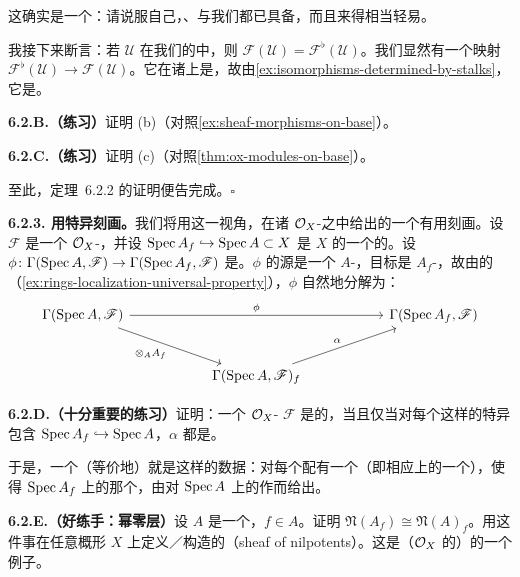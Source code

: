 这确实是一个\trSheaf{}：请说服自己，\trRestrictionMap、\trIdentityAxiom{}与\trGluability{}我们都已具备，而且来得相当轻易。

我接下来断言：若 $\mathscr{U}$ 在我们的\trBase{}中，则 $\mathscr{F}(\mathscr{U})=\mathscr{F}^{\flat}(\mathscr{U})$。我们显然有一个映射 $\mathscr{F}^{\flat}(\mathscr{U})\to\mathscr{F}(\mathscr{U})$。它在诸\trStalk{}上是\trIsomorphism，故由\cref{ex:isomorphisms-determined-by-stalks}，它是\trIsomorphism。

\textbf{6.2.B.（练习）}\quad 证明 (b)（对照\cref{ex:sheaf-morphisms-on-base}）。

\textbf{6.2.C.（练习）}\quad 证明 (c)（对照\cref{thm:ox-modules-on-base}）。

至此，定理~6.2.2 的证明便告完成。\hfill$\square$

\textbf{6.2.3. 用特异\trInclusionMap{}刻画\trQCSheaf。}\quad 我们将用这一视角，在诸 $\mathcal{O}_X$-\trModule{}之中给出\trQCSheaf{}的一个有用刻画。设 $\mathscr{F}$ 是一个 $\mathcal{O}_X$-\trModule，并设 $\operatorname{Spec} A_f\hookrightarrow\operatorname{Spec} A\subset X$ 是 $X$ 的一个\trAffine\trOpenSubscheme{}的\trDistinguishedOpen\trSubscheme。设 $\phi\colon\Gamma(\operatorname{Spec} A,\mathscr{F})\to\Gamma(\operatorname{Spec} A_f,\mathscr{F})$ 是\trRestrictionMap。$\phi$ 的源是一个 $A$-\trModule，目标是 $A_f$-\trModule，故由\trLocalization{}的\trUniversalProperty{}（\cref{ex:rings-localization-universal-property}），$\phi$ 自然地分解为：
\[
\begin{tikzcd}[row sep=2.6em, column sep=5.5em]
\Gamma(\Spec A,\mathscr{F}) \ar[rr,"\phi"] \ar[dr,"\otimes_A A_f"'] && \Gamma(\Spec A_f,\mathscr{F}) \\
& \Gamma(\Spec A,\mathscr{F})_f \ar[ur,"\alpha"] &
\end{tikzcd}
\]

\textbf{6.2.D.（十分重要的练习）}\quad 证明：一个 $\mathcal{O}_X$-\trModule{} $\mathscr{F}$ 是\trQC{}的，当且仅当对每个这样的特异包含 $\operatorname{Spec} A_f\hookrightarrow\operatorname{Spec} A$，$\alpha$ 都是\trIsomorphism。

于是，一个\trQCSheaf{}（等价地）就是这样的数据：对每个\trAffine\trOpenSubset{}配有一个\trModule{}（即相应\trRing{}上的一个\trModule），使得\trDistinguishedOpen{} $\operatorname{Spec} A_f$ 上的那个\trModule，由对 $\operatorname{Spec} A$ 上的\trModule{}作\trLocalization{}而给出。

\textbf{6.2.E.（好练手：幂零层）}\quad 设 $A$ 是一个\trRing，$f\in A$。证明 $\mathfrak{N}(A_f)\cong\mathfrak{N}(A)_f$。用这件事在任意概形 $X$ 上定义／构造\trQC{}的\textbf{\trNilpotent\trSheaf}（sheaf of nilpotents）。这是（$\mathcal{O}_X$ 的）\trIdeal\trSheaf{}的一个例子。

